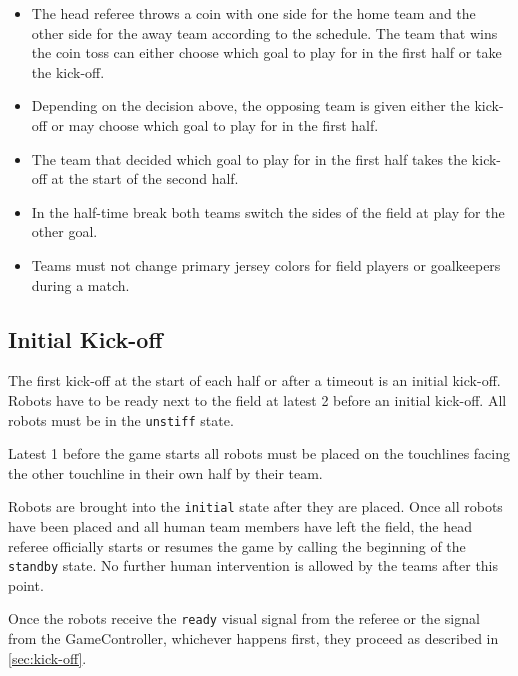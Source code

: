 \begin{itemize}
  \item The head referee throws a coin with one side for the home team and the other side for the away team according to the schedule.
    The team that wins the coin toss can either choose which goal to play for in the first half or take the kick-off.
  \item Depending on the decision above, the opposing team is given either the kick-off or may choose which goal to play for in the first half.
  \item The team that decided which goal to play for in the first half takes the kick-off at the start of the second half.
  \item In the half-time break both teams switch the sides of the field at play for the other goal.
  \item Teams must not change primary jersey colors for field players or goalkeepers during a match.
\end{itemize}

\subsection{Initial Kick-off}
\label{sec:initial-kick-off}

The first kick-off at the start of each half or after a timeout is an initial kick-off.
Robots have to be ready next to the field at latest \qty{2}{\min} before an initial kick-off.
All robots must be in the \texttt{unstiff} state.

Latest \qty{1}{\min} before the game starts all robots must be placed on the touchlines facing the other touchline in their own half by their team.

Robots are brought into the \texttt{initial} state after they are placed.
Once all robots have been placed and all human team members have left the field, the head referee officially starts or resumes the game by calling the beginning of the \texttt{standby} state.
No further human intervention is allowed by the teams after this point.

Once the robots receive the \texttt{ready} visual signal from the referee or the signal from the GameController, whichever happens first, they proceed as described in \cref{sec:kick-off}.

